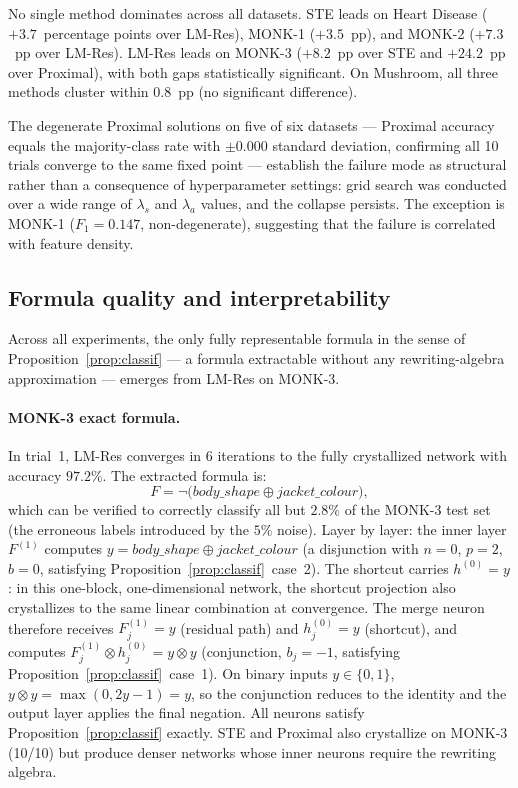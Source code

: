 \documentclass[12pt,a4paper]{article}
\newcommand{\tnorm}{\otimes}      %
\newcommand{\disj}{\oplus}        %
\begin{document}
No single method dominates across all datasets.
STE leads on Heart Disease ($+3.7$~percentage points over LM-Res),
MONK-1 ($+3.5$~pp), and MONK-2 ($+7.3$~pp over LM-Res).
LM-Res leads on MONK-3 ($+8.2$~pp over STE and $+24.2$~pp over Proximal),
with both gaps statistically significant.
On Mushroom, all three methods cluster within $0.8$~pp (no significant
difference).

The degenerate Proximal solutions on five of six datasets
--- Proximal accuracy equals the majority-class rate with $\pm 0.000$ standard
deviation, confirming all 10 trials converge to the same fixed point ---
establish the failure mode as structural rather than a consequence of
hyperparameter settings: grid search was conducted over a wide range of
$\lambda_s$ and $\lambda_a$ values, and the collapse persists.
The exception is MONK-1 ($F_1 = 0.147$, non-degenerate), suggesting
that the failure is correlated with feature density.

\subsection{Formula quality and interpretability}
\label{ssec:formulas}

Across all experiments, the only fully representable formula in the sense of
Proposition~\ref{prop:classif} --- a formula extractable without any
rewriting-algebra approximation --- emerges from LM-Res on MONK-3.

\paragraph{MONK-3 exact formula.}
In trial~1, LM-Res converges in $6$ iterations to the fully crystallized
network with accuracy $97.2\%$.
The extracted formula is:
\begin{equation}
  F = \neg\!\bigl(\mathit{body\_shape} \disj \mathit{jacket\_colour}\bigr),
  \label{eq:monk3formula}
\end{equation}
which can be verified to correctly classify all but $2.8\%$ of the MONK-3
test set (the erroneous labels introduced by the $5\%$ noise).
Layer by layer: the inner layer $F^{(1)}$ computes
$y = \mathit{body\_shape} \disj \mathit{jacket\_colour}$ (a disjunction with
$n = 0$, $p = 2$, $b = 0$, satisfying Proposition~\ref{prop:classif}~case~2).
The shortcut carries $h^{(0)} = y$: in this one-block, one-dimensional
network, the shortcut projection also crystallizes to the same linear
combination at convergence.
The merge neuron therefore receives $F^{(1)}_j = y$ (residual path) and
$h^{(0)}_j = y$ (shortcut), and computes
$F^{(1)}_j \tnorm h^{(0)}_j = y \tnorm y$
(conjunction, $b_j = -1$, satisfying Proposition~\ref{prop:classif}~case~1).
On binary inputs $y \in \{0,1\}$, $y \tnorm y = \max(0, 2y - 1) = y$,
so the conjunction reduces to the identity and the output layer applies
the final negation.
All neurons satisfy Proposition~\ref{prop:classif} exactly.
STE and Proximal also crystallize on MONK-3 (10/10) but produce denser networks
whose inner neurons require the rewriting algebra.
\end{document}
